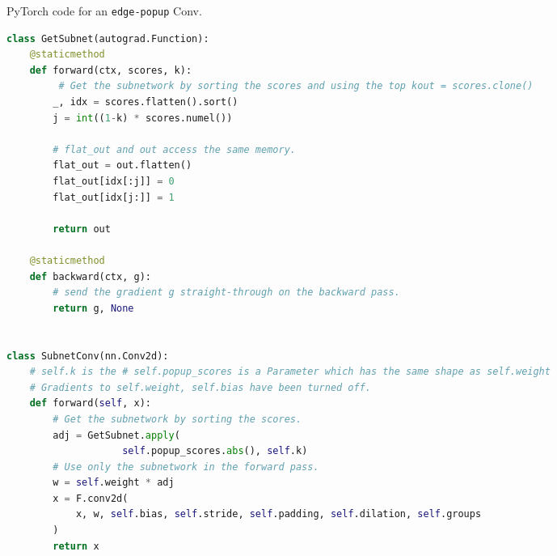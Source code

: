 \documentclass[10pt,twocolumn,letterpaper]{article}
\newcommand{\alg}{\texttt{edge-popup} }
\begin{document}
\begin{algorithm}[t]
\caption{PyTorch code for an \alg Conv.}
\label{alg:code}
\begin{lstlisting}[language=python]
class GetSubnet(autograd.Function):
    @staticmethod
    def forward(ctx, scores, k):
         # Get the subnetwork by sorting the scores and using the top kout = scores.clone()
        _, idx = scores.flatten().sort()
        j = int((1-k) * scores.numel())

        # flat_out and out access the same memory.
        flat_out = out.flatten()
        flat_out[idx[:j]] = 0
        flat_out[idx[j:]] = 1

        return out

    @staticmethod
    def backward(ctx, g):
        # send the gradient g straight-through on the backward pass.
        return g, None
        

class SubnetConv(nn.Conv2d):
    # self.k is the # self.popup_scores is a Parameter which has the same shape as self.weight
    # Gradients to self.weight, self.bias have been turned off.
    def forward(self, x):
        # Get the subnetwork by sorting the scores.
        adj = GetSubnet.apply(
                    self.popup_scores.abs(), self.k)
        # Use only the subnetwork in the forward pass.
        w = self.weight * adj
        x = F.conv2d(
            x, w, self.bias, self.stride, self.padding, self.dilation, self.groups
        )
        return x
        
\end{lstlisting}
\end{algorithm}
\end{document}
